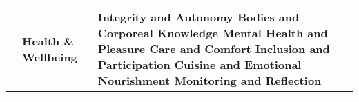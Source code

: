\begin{table}[th]
\begin{center}
\begin{tabular}{ >{\raggedright\arraybackslash}p{} >{\raggedright\arraybackslash}p{} >{\raggedright\arraybackslash}p{} }
  & Health \& Wellbeing & Integrity and Autonomy \linebreak Bodies and Corporeal Knowledge \linebreak Mental Health and Pleasure \linebreak Care and Comfort \linebreak Inclusion and Participation \linebreak Cuisine and Emotional Nourishment \linebreak Monitoring and Reflection \\
\hline
\label{tbl:incomesByUfarmens4}
\end{tabular}
\end{center}
\end{table}

